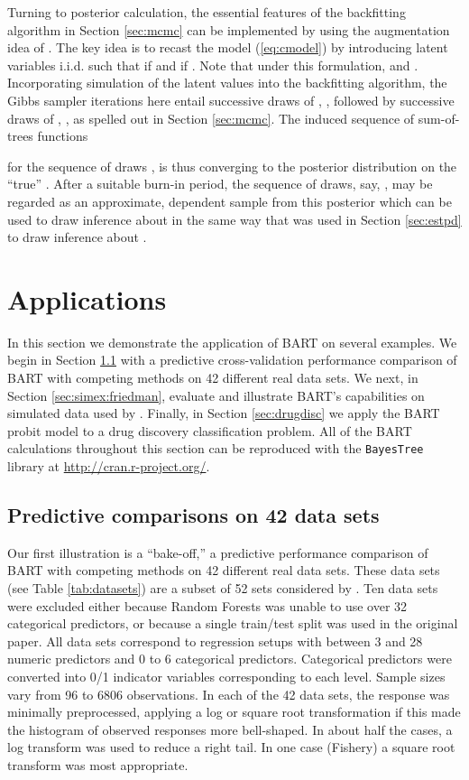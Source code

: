 \documentclass[aoas,nameyear,dvips]{arximspdf}
\newcommand{\citeasnoun}[1]{\citet{#1}}
\begin{document}
Turning to posterior calculation, the essential features of the
backfitting algorithm in Section \ref{sec:mcmc} can be implemented by
using the augmentation idea of \citeasnoun{AlbeChib1993}. The key idea
is to recast the model (\ref{eq:cmodel}) by introducing latent
variables  i.i.d.  such that 
if  and  if .  Note that under this
formulation,  and .  Incorporating simulation of
the latent  values into the backfitting algorithm, the Gibbs
sampler iterations here entail  successive draws of ,
,  followed by  successive draws of , , as spelled out in
Section \ref{sec:mcmc}.  The induced sequence of sum-of-trees functions

for the sequence of draws , is
thus converging to the posterior distribution on the ``true''
.  After a suitable burn-in period, the sequence of 
draws, say, , may be regarded as an approximate,
dependent sample from this posterior which can be used to draw
inference about  in the same way that  was
used in Section \ref{sec:estpd} to draw inference about .


\section{Applications}\label{sec:examples}

In this section we demonstrate the application of BART on several
examples. We begin in Section \ref{sec:bakeoff} with a predictive
cross-validation performance comparison of BART with competing methods
on 42 different real data sets.  We next, in Section
\ref{sec:simex:friedman}, evaluate and illustrate BART's capabilities
on simulated data used by \citeasnoun{Frie1991}.  Finally, in Section
\ref{sec:drugdisc} we apply the BART probit model to a drug discovery
classification problem.  All of the BART calculations throughout this
section can be reproduced with the \texttt{BayesTree} library at
\url{http://cran.r-project.org/}.




\subsection{Predictive comparisons on 42 data sets}\label{sec:bakeoff}

Our first illustration is a ``bake-off,'' a predictive
performance comparison of BART with competing methods on 42 different real data sets.
These data sets (see Table \ref{tab:datasets}) are a subset of 52 sets considered by \citeasnoun{KimLohShiCha2007}.
Ten data sets were excluded either because Random Forests was unable to use over 32
categorical predictors, or because a single train/test split was used
in the original paper.  All data sets correspond to regression setups with
between 3 and 28 numeric predictors and 0 to 6 categorical predictors.
Categorical predictors were converted into 0/1 indicator variables
corresponding to each level.  Sample sizes vary from 96 to 6806 observations.
In each of the 42 data sets, the response was minimally preprocessed,
applying a log or square root transformation if this made the histogram
of observed responses more bell-shaped.  In about half the cases, a log
transform was used to reduce a right tail.  In one case (Fishery) a square
root transform was most appropriate.
\end{document}
